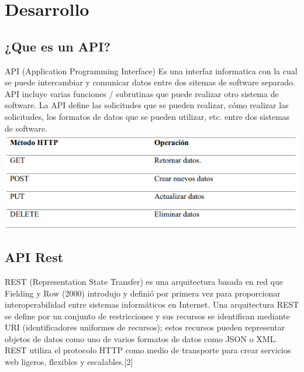 \documentclass[twocolumn]{article}
\begin{document}
\section{Desarrollo}
\subsection{¿Que es un API?}
API (Application Programming Interface) Es una interfaz informatica con la cual se puede intercambiar y comunicar datos entre dos sitemas de software separado.
API incluye varias funciones / subrutinas que puede realizar otro sistema de software. La API define las solicitudes que se pueden realizar, cómo realizar las solicitudes, los formatos de datos que se pueden utilizar, etc. entre dos sistemas de software.\\

\includegraphics[width=1.02\linewidth]{img/foto1}
\subsection{API Rest}
REST (Representation State Transfer) es una arquitectura basada en red que Fielding y Row
(2000) introdujo y definió por primera vez para proporcionar interoperabilidad entre sistemas
informáticos en Internet. Una arquitectura REST se define por un conjunto de restricciones y
sus recursos se identifican mediante URI (identificadores uniformes de recursos); estos
recursos pueden representar objetos de datos como uno de varios formatos de datos como JSON
o XML.
REST utiliza el protocolo HTTP como medio de transporte para crear servicios web ligeros,
flexibles y escalables.[2]
\end{document}
